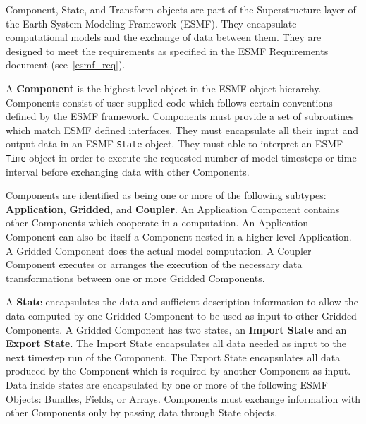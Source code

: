 %


Component, State, and Transform objects are part of the Superstructure 
layer of the Earth System Modeling Framework (ESMF).  They encapsulate
computational models and the exchange of data between them.
They are designed to meet the requirements as specified in the
ESMF Requirements document (see~\ref{esmf_req}).

A {\bf Component} 
is the highest level object in the ESMF object
hierarchy.  Components consist of user supplied code
which follows certain conventions defined by the ESMF framework. 
Components must provide a set of subroutines which match ESMF
defined interfaces. They must encapsulate
all their input and output data in an ESMF {\tt State} object.  They
must able to interpret an ESMF {\tt Time} object in order
to execute the requested number of model timesteps or time interval
before exchanging data with other Components.

Components are identified as being one or more of the
following subtypes: {\bf Application}, {\bf Gridded}, and {\bf Coupler}.  
An Application Component contains other Components which
cooperate in a computation. An Application Component can also be itself a
Component nested in a higher level Application.  A Gridded Component
does the actual model computation.  A Coupler Component executes or
arranges the execution of the necessary data transformations between one
or more Gridded Components.


A {\bf State} 
encapsulates the data and sufficient description information
to allow the data computed by one Gridded Component to be
used as input to other Gridded Components.  A Gridded Component has
two states, an {\bf Import State} and an {\bf Export State}.
The Import State encapsulates all data needed as input to the
next timestep run of the Component.  The Export State encapsulates 
all data produced by the Component which is required by another
Component as input.  Data inside states are encapsulated by one 
or more of the following ESMF Objects: Bundles, Fields, or Arrays.
Components must exchange information with other Components
only by passing data through State objects.

